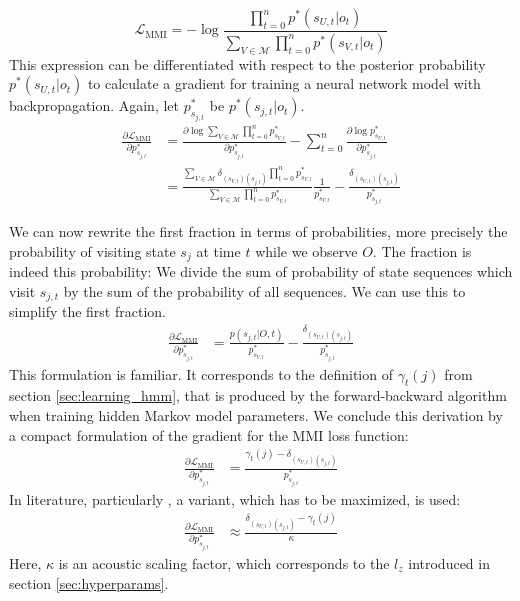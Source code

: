 \[
\mathcal{L}_{\text{MMI}} = -\log\frac{\prod_{t = 0}^{n} p^*(s_{U,t}|o_{t})}{\sum_{V \in \mathcal{M}} \prod_{t = 0}^{n} p^*(s_{V,t}|o_{t})} 
\]
This expression can be differentiated with respect to the posterior probability $p^*(s_{U,t}|o_{t})$ to calculate a gradient for training a neural network model with backpropagation. Again, let $p^*_{s_{j,t}}$ be $p^*(s_{j,t}|o_t)$.
\begin{align*}
\frac{\partial\mathcal{L}_{\text{MMI}}}{\partial p^*_{s_{j,t}}} &= \frac{\partial \log \sum_{V \in \mathcal{M}} \prod_{t = 0}^{n} p^*_{s_{V,t}}}{\partial p^*_{s_{j,t}}} - \sum_{t = 0}^{n} \frac{\partial \log p^*_{s_{U,t}}}{\partial p^*_{s_{j,t}}} \\
&= \frac{ \sum_{V \in \mathcal{M}} \delta_{(s_{V,t})(s_{j,t})} \prod_{t = 0}^{n} p^*_{s_{V,t}}}{\sum_{V \in \mathcal{M}} \prod_{t = 0}^{n} p^*_{s_{V,t}}}\frac{1}{p^*_{s_{V,t}}} - \frac{\delta_{(s_{U,t})(s_{j,t})}}{p^*_{s_{j,t}}}
\end{align*}

We can now rewrite the first fraction in terms of probabilities, more precisely the probability of visiting state $s_{j}$ at time $t$ while we observe $O$. The fraction is indeed this probability: We divide the sum of probability of state sequences which visit $s_{j,t}$ by the sum of the probability of all sequences. We can use this to simplify the first fraction.
\begin{align*}
\frac{\partial\mathcal{L}_{\text{MMI}}}{\partial p^*_{s_{j,t}}} &= \frac{p(s_{j,t}|O, t)}{p^*_{s_{V,t}}} - \frac{\delta_{(s_{U,t})(s_{j,t})}}{p^*_{s_{j,t}}}
\end{align*}
This formulation is familiar. It corresponds to the definition of $\gamma_t(j)$ from section \ref{sec:learning_hmm}, that is produced by the forward-backward algorithm when training hidden Markov model parameters. We conclude this derivation by a compact formulation of the gradient for the MMI loss function:
\begin{align}
\label{eq:mmi_grad}
\frac{\partial\mathcal{L}_{\text{MMI}}}{\partial p^*_{s_{j,t}}} &=  \frac{\gamma_t(j) -\delta_{(s_{U,t})(s_{j,t})}}{p^*_{s_{j,t}}}
\end{align} 
In literature, particularly \cite{ghoshal2013sequence}, a variant, which has to be maximized, is used: 
\begin{align}
\label{eq:mmi_grad_simple}
\frac{\partial\mathcal{L}_{\text{MMI}}}{\partial p^*_{s_{j,t}}} &\approx \frac{\delta_{(s_{U,t})(s_{j,t})} - \gamma_t(j)}{\kappa}
\end{align}
Here, $\kappa$ is an acoustic scaling factor, which corresponds to the $l_z$ introduced in section \ref{sec:hyperparams}.

